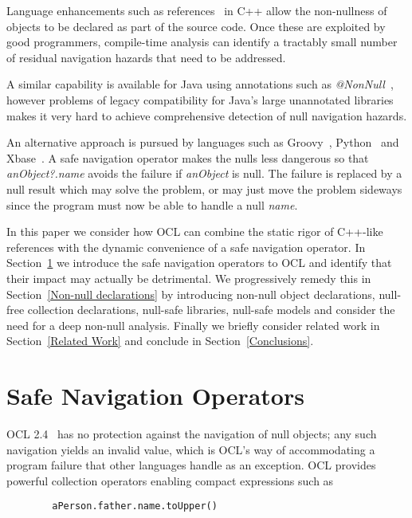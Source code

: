 \documentclass{llncs}
\begin{document}
Language enhancements such as references~\cite{c++-references} in C++ allow the non-nullness of objects to be declared as part of the source code. Once these are exploited by good programmers, compile-time analysis can identify a tractably small number of residual navigation hazards that need to be addressed.

A similar capability is available for Java using annotations such as \emph{@NonNull}~\cite{java-NonNull}, however problems of legacy compatibility for Java's large unannotated libraries makes it very hard to achieve comprehensive detection of null navigation hazards.

An alternative approach is pursued by languages such as Groovy~\cite{groovy}, Python~\cite{python} and Xbase~\cite{xbase}. A safe navigation operator makes the nulls less dangerous so that \emph{anObject?.name} avoids the failure if \emph{anObject} is null. The failure is replaced by a null result which may solve the problem, or may just move the problem sideways since the program must now be able to handle a null \emph{name}.

In this paper we consider how OCL can combine the static rigor of C++-like references with the dynamic convenience of a safe navigation operator. In Section~\ref{Safe Navigation Operators} we introduce the safe navigation operators to OCL and identify that their impact may actually be detrimental. We progressively remedy this in Section~\ref{Non-null declarations} by introducing non-null object declarations, null-free collection declarations, null-safe libraries, null-safe models and consider the need for a deep non-null analysis. Finally we briefly consider related work in Section~\ref{Related Work} and conclude in Section~\ref{Conclusions}.

\section{Safe Navigation Operators}\label{Safe Navigation Operators}

OCL 2.4~\cite{OCL-2.4} has no protection against the navigation of null objects; any such navigation yields an invalid value, which is OCL's way of accommodating a program failure that other languages handle as an exception. OCL provides powerful collection operators enabling compact expressions such as

\begin{verbatim}
        aPerson.father.name.toUpper()
\end{verbatim}
\end{document}
